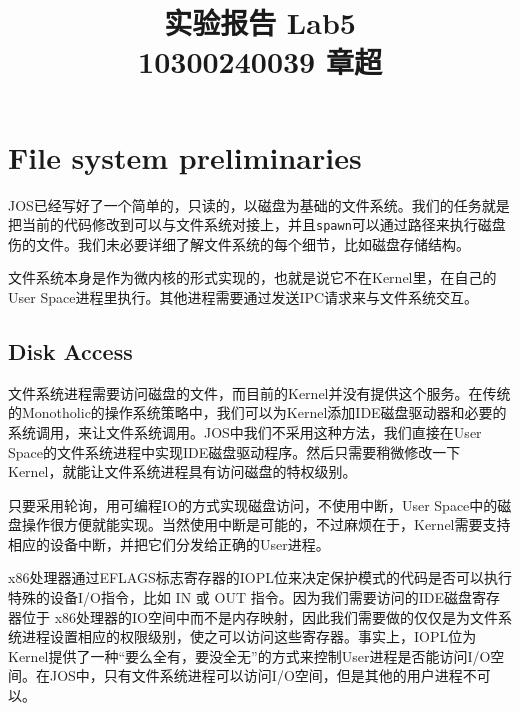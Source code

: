\documentclass[11pt]{article}
\begin{document}
\title{\textbf{\huge{实验报告 Lab5}}\\
10300240039 章超}
\maketitle
\section{File system preliminaries}
JOS已经写好了一个简单的，只读的，以磁盘为基础的文件系统。我们的任务就是把当前的代码修改到可以与文件系统对接上，并且\lstinline|spawn|可以通过路径来执行磁盘伤的文件。我们未必要详细了解文件系统的每个细节，比如磁盘存储结构。

文件系统本身是作为微内核的形式实现的，也就是说它不在Kernel里，在自己的User Space进程里执行。其他进程需要通过发送IPC请求来与文件系统交互。
\subsection{Disk Access}
文件系统进程需要访问磁盘的文件，而目前的Kernel并没有提供这个服务。在传统的Monotholic的操作系统策略中，我们可以为Kernel添加IDE磁盘驱动器和必要的系统调用，来让文件系统调用。JOS中我们不采用这种方法，我们直接在User Space的文件系统进程中实现IDE磁盘驱动程序。然后只需要稍微修改一下Kernel，就能让文件系统进程具有访问磁盘的特权级别。 

只要采用轮询，用可编程IO的方式实现磁盘访问，不使用中断，User Space中的磁盘操作很方便就能实现。当然使用中断是可能的，不过麻烦在于，Kernel需要支持相应的设备中断，并把它们分发给正确的User进程。

x86处理器通过EFLAGS标志寄存器的IOPL位来决定保护模式的代码是否可以执行特殊的设备I/O指令，比如 IN 或 OUT 指令。因为我们需要访问的IDE磁盘寄存器位于 x86处理器的IO空间中而不是内存映射，因此我们需要做的仅仅是为文件系统进程设置相应的权限级别，使之可以访问这些寄存器。事实上，IOPL位为Kernel提供了一种“要么全有，要没全无”的方式来控制User进程是否能访问I/O空间。在JOS中，只有文件系统进程可以访问I/O空间，但是其他的用户进程不可以。 
\end{document}
